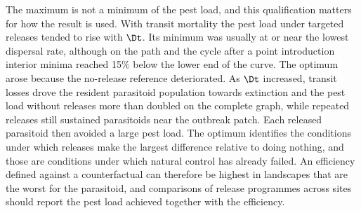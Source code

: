 The maximum is not a minimum of the pest load, and this qualification matters for how the result is used. With transit mortality the pest load under targeted releases tended to rise with $\Dt$. Its minimum was usually at or near the lowest dispersal rate, although on the path and the cycle after a point introduction interior minima reached 15\% below the lower end of the curve. The optimum arose because the no-release reference deteriorated. As $\Dt$ increased, transit losses drove the resident parasitoid population towards extinction and the pest load without releases more than doubled on the complete graph, while repeated releases still sustained parasitoids near the outbreak patch. Each released parasitoid then avoided a large pest load. The optimum identifies the conditions under which releases make the largest difference relative to doing nothing, and those are conditions under which natural control has already failed. An efficiency defined against a counterfactual can therefore be highest in landscapes that are the worst for the parasitoid, and comparisons of release programmes across sites should report the pest load achieved together with the efficiency.

